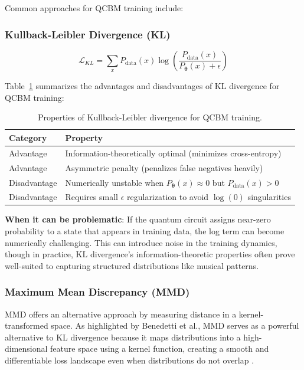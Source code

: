 \documentclass[11pt,a4paper]{article}
\begin{document}
Common approaches for QCBM training include:

\subsubsection{Kullback-Leibler Divergence (KL)}
\[
\mathcal{L}_{KL} = \sum_{x} P_{\text{data}}(x) \log \left( \frac{P_{\text{data}}(x)}{P_{\boldsymbol{\theta}}(x) + \epsilon} \right)
\]

Table~\ref{tab:kl_properties} summarizes the advantages and disadvantages of KL divergence for QCBM training:

\begin{table}[H]
\centering
\begin{tabular}{lp{10cm}}
\toprule
\textbf{Category} & \textbf{Property} \\
\midrule
Advantage & Information-theoretically optimal (minimizes cross-entropy) \\
Advantage & Asymmetric penalty (penalizes false negatives heavily) \\
\addlinespace
Disadvantage & Numerically unstable when $P_{\boldsymbol{\theta}}(x) \approx 0$ but $P_{\text{data}}(x) > 0$ \\
Disadvantage & Requires small $\epsilon$ regularization to avoid $\log(0)$ singularities \\
\bottomrule
\end{tabular}
\caption{Properties of Kullback-Leibler divergence for QCBM training.}
\label{tab:kl_properties}
\end{table}

\textbf{When it can be problematic}: If the quantum circuit assigns near-zero probability to a state that appears in training data, the log term can become numerically challenging. This can introduce noise in the training dynamics, though in practice, KL divergence's information-theoretic properties often prove well-suited to capturing structured distributions like musical patterns.

\subsubsection{Maximum Mean Discrepancy (MMD)}

MMD offers an alternative approach by measuring distance in a kernel-transformed space. As highlighted by Benedetti et al., MMD serves as a powerful alternative to KL divergence because it maps distributions into a high-dimensional feature space using a kernel function, creating a smooth and differentiable loss landscape even when distributions do not overlap \cite{Benedetti2019}.
\end{document}
